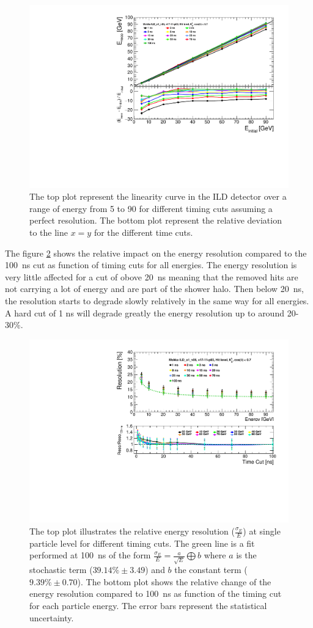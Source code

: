 \begin{figure}[htbp!]
  \centering
  \includegraphics[width=0.7\linewidth]{../Thesis_Plots/ILD/NoSmearing/Plots/Linearity_TimeCuts_noSmearing}
  \caption{The top plot represent the linearity curve in the ILD detector over a range of energy from 5 \GeV to 90 \GeV for different timing cuts assuming a perfect resolution. The bottom plot represent the relative deviation to the line $x=y$ for the different time cuts.} \label{fig:linearityNoSmearing}
\end{figure}

The figure \ref{fig:resoNoSmearing} shows the relative impact on the energy resolution compared to the \SI{100}{\nano\second} cut as function of timing cuts for all energies. The energy resolution is very little affected for a cut of obove \SI{20}{\nano\second} meaning that the removed hits are not carrying a lot of energy and are part of the shower halo. Then below \SI{20}{\nano\second}, the resolution starts to degrade slowly relatively in the same way for all energies. A hard cut of 1 ns will degrade greatly the energy resolution up to around 20-30\%.

\begin{figure}[htbp!]
  \centering
  \includegraphics[width=0.7\linewidth]{../Thesis_Plots/ILD/NoSmearing/Plots/ShowerResoAbsolute_TimeCuts_noSmearing}
  \caption{The top plot illustrates the relative energy resolution ($\frac{\sigma_{E}}{E}$) at single particle level for different timing cuts. The green line is a fit performed at \SI{100}{\nano\second} of the form $\frac{\sigma_{E}}{E} = \frac{a}{\sqrt{E}} \bigoplus b$ where $a$ is the stochastic term ($39.14\% \pm 3.49$) and $b$ the constant term ($9.39\% \pm 0.70$). The bottom plot shows the relative change of the energy resolution compared to \SI{100}{\nano\second} as function of the timing cut for each particle energy. The error bars represent the statistical uncertainty.} \label{fig:resoNoSmearing}
\end{figure}


